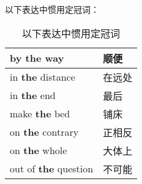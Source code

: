 \documentclass[UTF8]{ctexart}
\begin{document}
    以下表达中惯用定冠词：
    \begin{table}[h!]
        \begin{center}
            \ttfamily
            \begin{tabular}{p{180pt}|p{100pt}}
                \hline
                by \textbf{the} way&顺便\\ \hline
                in \textbf{the} distance&在远处\\ \hline
                in \textbf{the} end&最后\\ \hline
                make \textbf{the} bed&铺床\\ \hline
                on \textbf{the} contrary&正相反\\ \hline
                on \textbf{the} whole&大体上\\ \hline
                out of \textbf{the} question&不可能\\ \hline
            \end{tabular}
            \rmfamily
            \caption{以下表达中惯用定冠词}
        \end{center}
    \end{table}\\

\newpage
\end{document}
